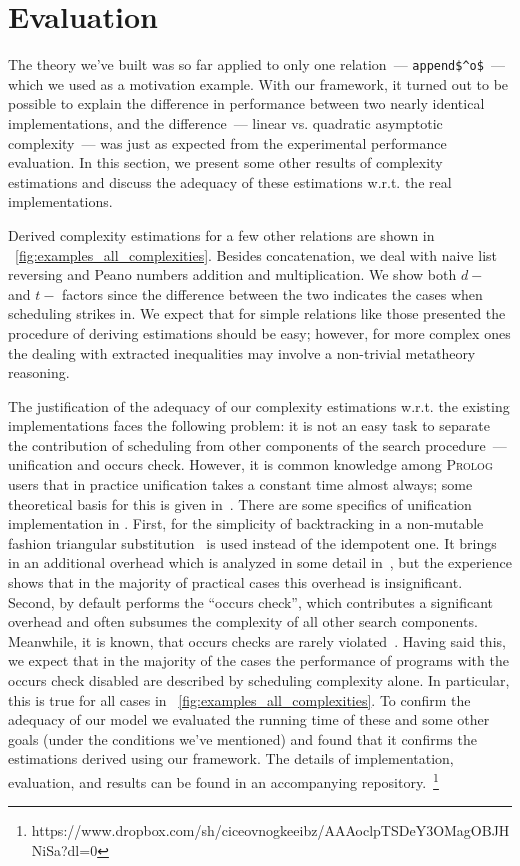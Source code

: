 \section{Evaluation}
\label{sec:evaluation}

The theory we've built was so far applied to only one relation~--- \lstinline|append$^o$|~--- which we used as a motivation example. With our framework, it turned out
to be possible to explain the difference in performance between two nearly identical implementations, and the difference~--- linear vs. quadratic asymptotic
complexity~--- was just as expected from the experimental performance evaluation. In this section, we present some other results of complexity estimations and
discuss the adequacy of these estimations w.r.t. the real \mK implementations.

Derived complexity estimations for a few other relations are shown in \figureword~\ref{fig:examples_all_complexities}. Besides concatenation, we deal with
naive list reversing and Peano numbers addition and multiplication. We show both $d-$ and $t-$ factors since the difference between the two indicates the
cases when scheduling strikes in. We expect that for simple relations like those presented the procedure of deriving estimations should be easy; however,
for more complex ones the dealing with extracted inequalities may involve a non-trivial metatheory reasoning.

The justification of the adequacy of our complexity estimations w.r.t. the existing \mK implementations faces the following problem: it is
not an easy task to separate the contribution of scheduling from other components of the search procedure~--- unification and occurs check. However, it is common
knowledge among \textsc{Prolog} users that in practice unification takes a constant time almost always; some theoretical basis for this is given in~\cite{UnificationAverageCost}.
There are some specifics of unification implementation in \mK. First, for the simplicity of backtracking in a non-mutable fashion triangular
substitution~\cite{UnificationTheory} is used instead of the idempotent one. It brings in an additional overhead which is analyzed
in some detail in~\cite{WillsThesis}, but the experience shows that in the majority of practical cases this overhead is insignificant. Second, \mK by default
performs the ``occurs check'', which contributes a significant overhead and often subsumes the complexity of all other search components. Meanwhile, it is known, that occurs checks are rarely
violated~\cite{OccursCheckNotAProblem}. Having said this, we expect that in the majority of the cases the performance of \mK programs with the occurs check disabled are
described by scheduling complexity alone. In particular, this is true for all cases in \figureword~\ref{fig:examples_all_complexities}. To confirm the adequacy of
our model we evaluated the running time of these and some other goals (under the conditions we've mentioned) and found that it confirms the estimations derived
using our framework. The details of implementation, evaluation, and results can be found in an accompanying repository.~\footnote{https://www.dropbox.com/sh/ciceovnogkeeibz/AAAoclpTSDeY3OMagOBJHNiSa?dl=0}

